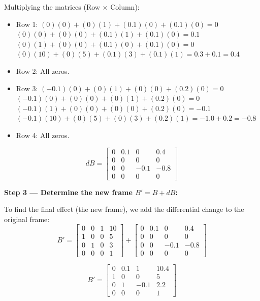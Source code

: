 \documentclass[12pt,a3paper]{article}
\begin{document}
\begin{enumerate}
\begin{tcolorbox}[enhanced,breakable,ansbox,colback=cB!4,colframe=cB,
  boxrule=0.8pt,arc=5pt,
  title={\textbf{Answer}},fonttitle=\bfseries\color{white},
  colbacktitle=cB]
Multiplying the matrices (Row $\times$ Column):
\begin{itemize}
    \item Row 1: $(0)(0) + (0)(1) + (0.1)(0) + (0.1)(0) = 0$ \\
                 $(0)(0) + (0)(0) + (0.1)(1) + (0.1)(0) = 0.1$ \\
                 $(0)(1) + (0)(0) + (0.1)(0) + (0.1)(0) = 0$ \\
                 $(0)(10) + (0)(5) + (0.1)(3) + (0.1)(1) = 0.3 + 0.1 = 0.4$
    \item Row 2: All zeros.
    \item Row 3: $(-0.1)(0) + (0)(1) + (0)(0) + (0.2)(0) = 0$ \\
                 $(-0.1)(0) + (0)(0) + (0)(1) + (0.2)(0) = 0$ \\
                 $(-0.1)(1) + (0)(0) + (0)(0) + (0.2)(0) = -0.1$ \\
                 $(-0.1)(10) + (0)(5) + (0)(3) + (0.2)(1) = -1.0 + 0.2 = -0.8$
    \item Row 4: All zeros.
\end{itemize}

\[
  dB =
  \begin{bmatrix}
    0 & 0.1 & 0 & 0.4 \\
    0 & 0 & 0 & 0 \\
    0 & 0 & -0.1 & -0.8 \\
    0 & 0 & 0 & 0
  \end{bmatrix}
\]

\medskip
\textbf{Step 3 — Determine the new frame $B' = B + dB$:}

To find the final effect (the new frame), we add the differential change to the original frame:
\[
  B' =
  \begin{bmatrix}
    0 & 0 & 1 & 10 \\
    1 & 0 & 0 & 5 \\
    0 & 1 & 0 & 3 \\
    0 & 0 & 0 & 1
  \end{bmatrix}
  +
  \begin{bmatrix}
    0 & 0.1 & 0 & 0.4 \\
    0 & 0 & 0 & 0 \\
    0 & 0 & -0.1 & -0.8 \\
    0 & 0 & 0 & 0
  \end{bmatrix}
\]

\[
  \boxed{B' =
  \begin{bmatrix}
    0 & 0.1 & 1 & 10.4 \\
    1 & 0 & 0 & 5 \\
    0 & 1 & -0.1 & 2.2 \\
    0 & 0 & 0 & 1
  \end{bmatrix}}
\]
\end{tcolorbox}


\end{enumerate}
\end{document}
